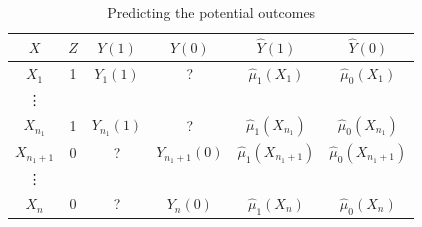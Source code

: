 \begin{table}
\centering
\caption{Predicting the potential outcomes}\label{tb::predict-po-ols}
\begin{tabular}{cccccc}
\hline 
$X$ & $Z$ & $Y(1)$ & $Y(0)$ &  $\hat{Y}(1)$ & $\hat{Y}(0)$ \\
\hline
$X_1 $ & 1 & $Y_1(1)$ & ? & $\hat{\mu}_1(X_1 )$ & $\hat{\mu}_0(X_1)$ \\
\vdots \\
$X_{n_1}$ & 1 & $Y_{n_1}(1)$ & ? & $\hat{\mu}_1(X_{n_1})$ & $\hat{\mu}_0(X_{n_1})$ \\
$X_{n_1 + 1}$ & 0 & ? & $Y_{n_1+1}(0)$ & $\hat{\mu}_1(X_{n_1+1})$ & $\hat{\mu}_0(X_{n_1+1})$ \\
\vdots \\
$X_{n}$ & 0 & ? & $Y_{n}(0)$ & $\hat{\mu}_1(X_{n})$ & $\hat{\mu}_0(X_{n})$ \\
\hline 
\end{tabular}
\end{table}


